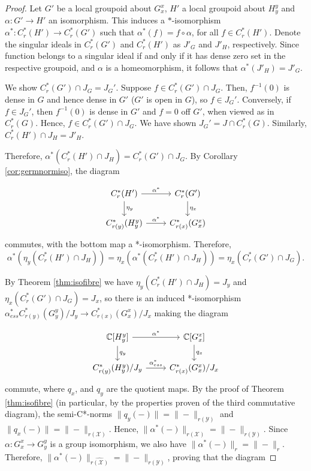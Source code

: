 \documentclass[a4paper, 12pt]{amsart}
\theoremstyle{definition}
\theoremstyle{remark}
\numberwithin{equation}{section}
\begin{document}
\begin{proof}
    Let $G'$ be a local groupoid about $G^{x}_{x}$, $H'$ a local groupoid about $H^{y}_{y}$ and $\alpha:G'\to H'$ an isomorphism. This induces a $*$-isomorphism $\alpha^{*}:C_{r}^{*}(H')\to C^{*}_{r}(G')$ such that $\alpha^{*}(f) = f\circ \alpha$, for all $f\in C^{*}_{r}(H')$. Denote the singular ideals in $C^{*}_{r}(G')$ and $C^{*}_{r}(H')$ as $J'_{G}$ and $J'_{H}$, respectively. Since function belongs to a singular ideal if and only if it has dense zero set in the respective groupoid, and $\alpha$ is a homeomorphism, it follows that $\alpha^{*}(J'_{H}) = J'_{G}$.
    
     We show $C^{*}_{r}(G')\cap J_{G} = J_{G}'$. Suppose $f\in C^{*}_{r}(G')\cap J_{G}$. Then, $f^{-1}(0)$ is dense in $G$ and hence dense in $G'$ ($G'$ is open in $G$), so $f\in J_{G}'$. Conversely, if $f\in J_{G}'$, then $f^{-1}(0)$ is dense in $G'$ and $f = 0$ off $G'$, when viewed as in $C^{*}_{r}(G)$. Hence, $f\in C^{*}_{r}(G')\cap J_{G}$. We have shown $J_{G}' = J\cap C^{*}_{r}(G)$. Similarly, $C^{*}_{r}(H')\cap J_{H} = J'_{H}$.

    Therefore, $\alpha^{*}(C^{*}_{r}(H')\cap J_{H}) = C^{*}_{r}(G')\cap J_{G}$. By Corollary \ref{cor:germnormiso}, the diagram 

    $$
\begin{tikzcd}
C^{*}_{r}(H') \arrow[r, "\alpha^{*}"] \arrow[d, "\eta_{y}"] & C^{*}_{r}(G') \arrow[d, "\eta_{x}"] \\
C^{*}_{r(y)}(H^{y}_{y}) \arrow[r, "\alpha^{*}"]             & C^{*}_{r(x)}(G^{x}_{x})            
\end{tikzcd}$$ commutes, with the bottom map a *-isomorphism. Therefore, $$\alpha^{*}(\eta_{y}(C^{*}_{r}(H')\cap J_{H})) = \eta_{x}(\alpha^{*}(C^{*}_{r}(H')\cap J_{H})) = \eta_{x}(C^{*}_{r}(G')\cap J_{G}).$$

By Theorem \ref{thm:isofibre} we have $\eta_{y}(C^{*}_{r}(H')\cap J_{H}) = J_{y}$ and $\eta_{x}(C^{*}_{r}(G')\cap J_{G}) = J_{x}$, so there is an induced *-isomorphism $\alpha^{*}_{ess}C^{*}_{r(y)}(G^{y}_{y})/J_{y}\to C^{*}_{r(x)}(G^{x}_{x})/J_{x}$ making the diagram

$$
\begin{tikzcd}
{\mathbb{C}[H^{y}_{y}]} \arrow[d, "q_{y}"] \arrow[r, "\alpha^{*}"] & {\mathbb{C}[G^{x}_{x}]} \arrow[d, "q_{x}"] \\
C^{*}_{r(y)}(H^{y}_{y})/J_{y} \arrow[r, "\alpha^{*}_{ess}"]        & C^{*}_{r(x)}(G^{x}_{x})/J_{x}             
\end{tikzcd}$$ commute, where $q_{x}$, and $q_{y}$ are the quotient maps. By the proof of Theorem \ref{thm:isofibre} (in particular, by the properties proven of the third commutative diagram), the semi-C*-norms $\|q_{y}(-)\| = \|-\|_{r(\mathcal{Y})}$ and $\|q_{x}(-)\| = \|-\|_{r(\mathcal{X})}$. Hence, $\|\alpha^{*}(-)\|_{r(\mathcal{X})} = \|-\|_{r(\mathcal{Y})}$. Since $\alpha:G^{x}_{x}\to G^{y}_{y}$ is a group isomorphism, we also have $\|\alpha^{*}(-)\|_{r} = \|-\|_{r}$. Therefore, $\|\alpha^{*}(-)\|_{\widehat{r(\mathcal{X})}} = \|-\|_{\widehat{r(\mathcal{Y})}}$, proving that the diagram


\end{proof}
\end{document}
